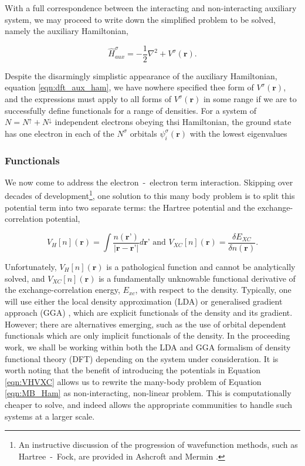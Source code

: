 With a full correspondence between the interacting and non-interacting auxiliary system, we may proceed to write down the simplified problem to be solved, namely the auxiliary Hamiltonian,

\begin{equation}
    \hat{H}^{\sigma}_{aux} = -\frac{1}{2}\nabla^{2} + V^{\sigma}(\textbf{r}).
    \label{eqn:dft_aux_ham}
\end{equation}

Despite the disarmingly simplistic appearance of the auxiliary Hamiltonian, equation \ref{eqn:dft_aux_ham}, we have nowhere specified thee form of $V^{\sigma}(\textbf{r})$, and the expressions must apply to all forms of $V^{\sigma}(\textbf{r})$ in some range if we are to successfully define functionals for a range of densities. For a system of $N= N^{\uparrow}+N^{\downarrow}$ independent electrons obeying thsi Hamiltonian, the ground state has one electron in each of the $N^{\sigma}$ orbitals $\psi_{i}^{\sigma}(\textbf{r})$ with the lowest eigenvalues 

\subsubsection{Functionals}
\label{sec:dft_funk}

We now come to address the electron~-~electron term interaction. Skipping over decades of development\footnote{An instructive discussion of the progression of wavefunction methods, such as Hartree~-~Fock, are provided in Ashcroft and Mermin \cite{Ashcroft76}.}, one solution to this many body problem is to split this potential term into two separate terms: the Hartree potential and the exchange-correlation potential,

\begin{equation}
    V_{H}[n](\textbf{r}) = \int \frac{ n(\textbf{r'}) }{ |\textbf{r} - \textbf{r'} | } d\textbf{r'} \text{ and } V_{XC}[n](\textbf{r}) = \frac{\delta E_{XC} }{\delta n(\textbf{r})}.
    \label{eqn:VHVXC}
\end{equation}

Unfortunately, $V_{H}[n](\textbf{r})$ is a pathological function and cannot be analytically solved, and $V_{XC}[n](\textbf{r})$ is a fundamentally unknowable functional derivative of the exchange-correlation energy, $E_{xc}$, with respect to the density. Typically, one will use either the local density approximation (LDA) \cite{KS} or generalised gradient approach (GGA) \cite{Purdue_Yue_GGA,GGA_Simple}, which are explicit functionals of the density and its gradient. However; there are alternatives emerging, such as the use of orbital dependent functionals which are only implicit functionals of the density. In the proceeding work, we shall be working within both the LDA and GGA formalism of density functional theory (DFT) depending on the system under consideration. It is worth noting that the benefit of introducing the potentials in Equation \ref{eqn:VHVXC} allows us to rewrite the many-body problem of Equation \ref{eqn:MB_Ham} as non-interacting, non-linear problem. This is computationally cheaper to solve, and indeed allows the appropriate communities to handle such systems at a larger scale.

